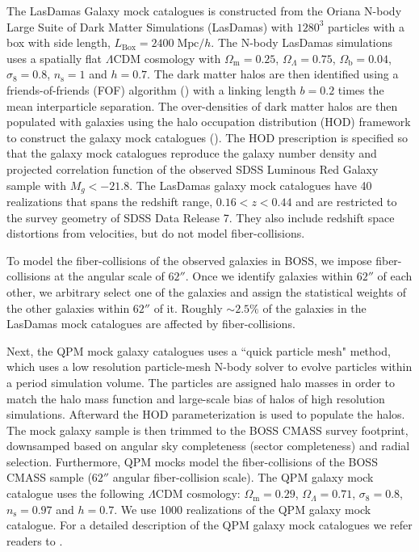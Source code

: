 \documentclass{emulateapj}
\begin{document}
The LasDamas Galaxy mock catalogues is constructed from the Oriana N-body Large Suite of Dark Matter Simulations (LasDamas) with $1280^3$ particles with a box with side length, $L_\mathrm{Box} = 2400\;\mathrm{Mpc}/h$. The N-body LasDamas simulations uses a spatially flat $\Lambda$CDM cosmology with $\Omega_\mathrm{m} = 0.25$, $\Omega_\Lambda = 0.75$, $\Omega_\mathrm{b} = 0.04$, $\sigma_8 = 0.8$, $n_\mathrm{s} = 1$ and $h=0.7$. The dark matter halos are then identified using a friends-of-friends (FOF) algorithm (\citealt{Davis:1985aa}) with a linking length $b = 0.2 $ times the mean interparticle separation. The over-densities of dark matter halos are then populated with galaxies using the halo occupation distribution (HOD) framework to construct the galaxy mock catalogues (\citealt{McBride:2009aa, McBride:2011aa}). The HOD prescription is specified so that the galaxy mock catalogues reproduce the galaxy number density and projected correlation function of the observed SDSS Luminous Red Galaxy sample with $M_g < -21.8$. The LasDamas galaxy mock catalogues have 40 realizations that spans the redshift range, $0.16 < z < 0.44$ and are restricted to the survey geometry of SDSS Data Release 7. They also include redshift space distortions from velocities, but do not model fiber-collisions. 

To model the fiber-collisions of the observed galaxies in BOSS, we impose fiber-collisions at the angular scale of $62''$. Once we identify galaxies within $62''$ of each other, we arbitrary select one of the galaxies and assign the statistical weights of the other galaxies within $62''$ of it. Roughly $\sim 2.5 \%$ of the galaxies in the LasDamas mock catalogues are affected by fiber-collisions. 

Next, the QPM mock galaxy catalogues uses a ``quick particle mesh" method, which uses a low resolution particle-mesh N-body solver to evolve particles within a period simulation volume. The particles are assigned halo masses  in order to match the halo mass function and large-scale bias of halos of high resolution simulations. Afterward the \cite{Tinker:2012aa} HOD parameterization is used to populate the halos. The mock galaxy sample is then trimmed to the BOSS CMASS survey footprint, downsamped based on angular sky completeness (sector completeness) and radial selection. Furthermore, QPM mocks model the fiber-collisions of the BOSS CMASS sample ($62''$ angular fiber-collision scale). The QPM galaxy mock catalogue uses the following $\Lambda$CDM cosmology: $\Omega_\mathrm{m} = 0.29$, $\Omega_\Lambda = 0.71$, $\sigma_8 = 0.8$, $n_\mathrm{s} = 0.97$ and $h=0.7$. We use 1000 realizations of the QPM galaxy mock catalogue. For a detailed description of the QPM galaxy mock catalogues we refer readers to \cite{White:2014aa}. 
\end{document}
